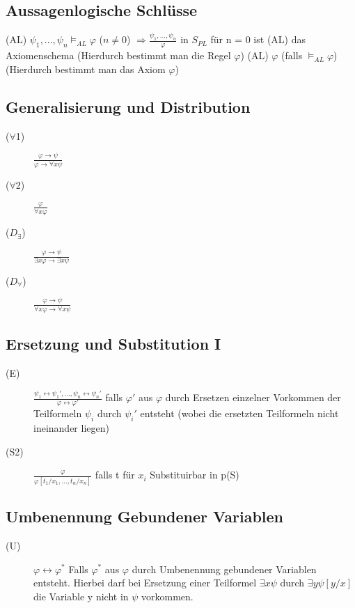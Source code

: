 \documentclass[12pt,a4paper]{article} %
\begin{document}
	\subsection{Aussagenlogische Schlüsse}
	(AL) $\psi_1, ..., \psi_n \vDash_{AL} \varphi$ ($n \ne 0$) $\Rightarrow \frac{\psi_1, ..., \psi_n}{\varphi}$ in $S_{PL}$ für n = 0 ist (AL) das Axiomenschema (Hierdurch bestimmt man die Regel $\varphi$)\newline
	(AL) $\varphi$ (falls $\vDash_{AL} \varphi$) (Hierdurch bestimmt man das Axiom $\varphi$)
	
	\subsection{Generalisierung und Distribution}
	\begin{description}
		\item[($\forall$1)] $\frac{\varphi \rightarrow \psi}{\varphi \rightarrow \forall x \psi}$
		\item[($\forall$2)] $\frac{\varphi}{\forall x \varphi}$
		\item[($D_{\exists}$)] $\frac{\varphi \rightarrow \psi}{\exists x \varphi \rightarrow \exists x \psi}$
		\item[($D_{\forall}$)] $\frac{\varphi \rightarrow \psi}{\forall x \varphi \rightarrow \forall x \psi}$
	\end{description}

	\subsection{Ersetzung und Substitution I}
	\begin{description}
		\item[(E)] $\frac{\psi_1 \leftrightarrow \psi_1', ..., \psi_n \leftrightarrow \psi_n'}{\varphi \leftrightarrow \varphi'}$ falls $\varphi'$ aus $\varphi$ durch Ersetzen einzelner Vorkommen der Teilformeln $\psi_i$ durch $\psi_i'$ entsteht (wobei die ersetzten Teilformeln nicht ineinander liegen)
		\item[(S2)] $\frac{\varphi}{\varphi[t_1/x_1, ..., t_n/x_n]}$ falls t für $x_i$ Substituirbar in p(S)
	\end{description}

	\subsection{Umbenennung Gebundener Variablen}
	\begin{description}
		\item[(U)] $\varphi \leftrightarrow \varphi^*$ \newline
		Falls $\varphi^*$ aus $\varphi$ durch Umbenennung gebundener Variablen entsteht. Hierbei darf bei Ersetzung einer Teilformel $\exists x \psi$ durch $\exists y \psi[y/x]$ die Variable y nicht in $\psi$ vorkommen.
	\end{description}
\end{document}
